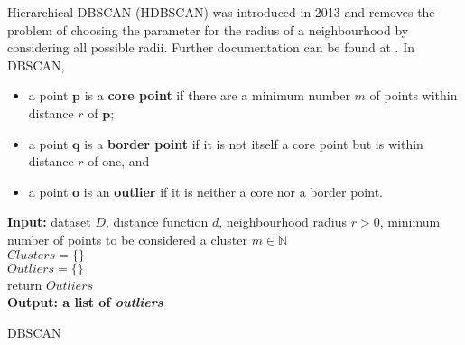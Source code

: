 Hierarchical DBSCAN (HDBSCAN) \cite{HDBSCAN} was introduced in 2013 and removes the problem of choosing the parameter for the radius of a neighbourhood by considering all possible radii. Further documentation can be found at \cite{HDBSCAN_code}. \newl 
In DBSCAN, 
\begin{itemize}[noitemsep]
\item a point $\mathbf{p}$ is a \textbf{core point} if there are a minimum number $m$ of points within distance $r$ of $\mathbf{p}$;
\item a point $\mathbf{q}$ is a \textbf{border point} if it is not itself a core point but is within distance $r$ of one, and 
\item a point $\mathbf{o}$ is an \textbf{outlier} if it is neither a core nor a border point.
\end{itemize}
\begin{algorithm}[h]
\SetAlgoLined
\textbf{Input:} dataset $D$,
distance function $d$,
neighbourhood radius $r>0$,
minimum number of points to be considered a cluster $m\in\mathbb{N}$
\\$\textit{Clusters} = \{\}$
\\$\textit{Outliers} = \{\}$
\\
return $\textit{Outliers}$
\\\textbf{Output: a list of \textit{outliers}}
\caption{DBSCAN}
\label{dbscan}
\end{algorithm}








